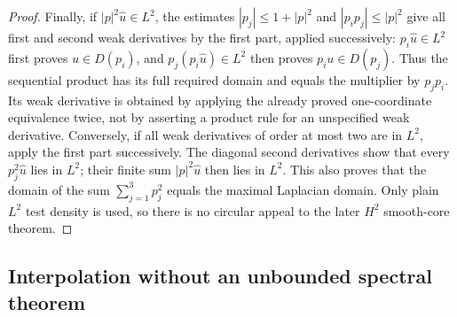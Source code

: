 \documentclass[11pt,a4paper]{article}
\theoremstyle{definition}
\theoremstyle{remark}
\begin{document}
\begin{proof}
Finally, if $|p|^2\widehat u\in L^2$, the estimates
$|p_j|\leq1+|p|^2$ and $|p_ip_j|\leq|p|^2$ give all first and
second weak derivatives by the first part, applied successively:
$p_i\widehat u\in L^2$ first proves $u\in D(p_i)$, and
$p_j(p_i\widehat u)\in L^2$ then proves $p_i u\in D(p_j)$.
Thus the sequential product has its full required domain and equals
the multiplier by $p_jp_i$. Its weak derivative is obtained by
applying the already proved one-coordinate equivalence twice, not by
asserting a product rule for an unspecified weak derivative.
Conversely, if all weak derivatives of order at most two are in
$L^2$, apply the first part successively. The diagonal second
derivatives show that every $p_j^2\widehat u$ lies in $L^2$; their
finite sum $|p|^2\widehat u$ then lies in $L^2$. This also proves that the
domain of the sum $\sum_{j=1}^3p_j^2$ equals the maximal Laplacian domain.
Only plain $L^2$ test density is used, so there is no circular appeal
to the later $H^2$ smooth-core theorem.
\end{proof}


\subsection{Interpolation without an unbounded spectral theorem}
\end{document}
